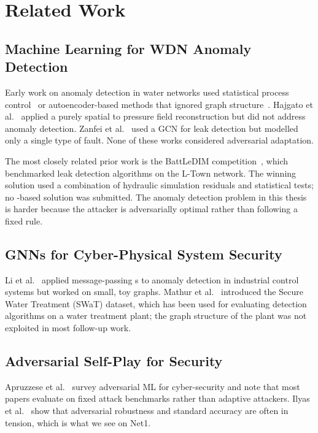 \section{Related Work}
\label{sec:related}

\subsection{Machine Learning for WDN Anomaly Detection}

Early work on anomaly detection in water networks used statistical
process control~\cite{klise2006statistical} or autoencoder-based
methods that ignored graph structure~\cite{taormina2019deep}.
Hajgato et al.~\cite{hajgato2021pressure} applied a purely spatial
\gnn{} to pressure field reconstruction but did not address anomaly
detection. Zanfei et al.~\cite{zanfei2022graph} used a GCN
for leak detection but modelled only a single type of fault. None of
these works considered adversarial adaptation.

The most closely related prior work is the BattLeDIM
competition~\cite{vrachimis2021battledim}, which benchmarked leak
detection algorithms on the L-Town network. The winning solution used
a combination of hydraulic simulation residuals and statistical
tests; no \gnn{}-based solution was submitted. The anomaly detection
problem in this thesis is harder because the attacker is adversarially
optimal rather than following a fixed rule.

\subsection{GNNs for Cyber-Physical System Security}

Li et al.~\cite{li2021gnn} applied message-passing \gnn{}s to anomaly
detection in industrial control systems but worked on small, toy
graphs. Mathur et al.~\cite{mathur2016swat} introduced the Secure
Water Treatment (SWaT) dataset, which has been used for evaluating
detection algorithms on a water treatment plant; the graph structure
of the plant was not exploited in most follow-up work.

\subsection{Adversarial Self-Play for Security}

Apruzzese et al.~\cite{apruzzese2023role} survey adversarial ML
for cyber-security and note that most papers evaluate on fixed
attack benchmarks rather than adaptive attackers. Ilyas
et al.~\cite{ilyas2019adversarial} show that adversarial robustness
and standard accuracy are often in tension, which is what we see on
Net1.

